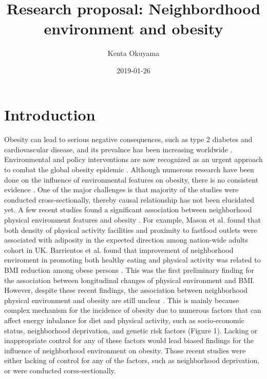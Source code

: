 \documentclass[12]{article}
\title{Research proposal: Neighbordhood environment and obesity}
\date{2019-01-26}
\author{Kenta Okuyama}
\begin{document}

\maketitle
\tableofcontents
\newpage
{}
  
\section{Introduction} %
\paragraph{}
Obesity can lead to serious negative consequences, such as type 2 diabetes and cardiovascular disease, and its prevalnce has been increasing worldwide \cite{ng2014global,flegal2002prevalence}. Environmental and policy interventions are now recognized as an urgent approach to combat the global obesity epidemic \cite{gortmaker2011changing}. Although numerous research have been done on the influence of environmental features on obesity, there is no consistent evidence \cite{papas2007built,mackenbach2014obesogenic}. One of the major challenges is that majority of the studies were conducted cross-sectionally, thereby causal relationship has not been elucidated yet. A few recent studies found a significant association between neighborhood  physical environment features and obesity \cite{mason2018associations,barrientos2017neighborhood}. For example, Mason et al. found that both density of physical activity facilities and proximity to fastfood outlets were associated with adiposity in the expected direction among nation-wide adults cohort in UK. Barrientos et al. found that improvement of neighborhood enviroment in promoting both healthy eating and physical activity was related to BMI reduction among obese persons \cite{barrientos2017neighborhood}. This was the first preliminary finding for the association between longitudinal changes of physical environment and BMI. However, despite these recent findings, the association between neighborhood physical environment and obesity are still unclear \cite{nieuwenhuijsen2018influence}. This is mainly because complex mechanism for the incidence of obesity due to numerous factors that can affect energy inbalance for diet and physical activity, such as socio-economic status, neighborhood deprivation, and genetic risk factors (Figure 1). Lacking or inappropriate control for any of these factors would lead biased findings for the influence of neighborhood environment on obesity. Those recent studies were either lacking of control for any of the factors, such as neighborhood deprivation, or were conducted corss-sectionally. 
\end{document}
